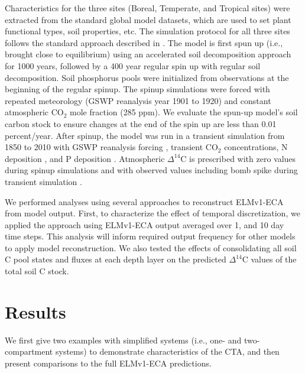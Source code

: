\documentclass[11pt,a4paper]{article}
\newcommand{\red}[1]{\textcolor{red}{#1}}
\newcommand{\gray}[1]{\textcolor{gray}{#1}}
\begin{document}
    Characteristics for the three sites (Boreal, Temperate, and Tropical sites) were extracted from the standard global model datasets, which are used to set plant functional types, soil properties, etc. The simulation protocol for all three sites follows the standard approach described in \citet{Oleson2010}. The model is first spun up (i.e., brought close to equilibrium) using an accelerated soil decomposition approach \citep{Koven2013} for 1000 years, followed by a 400 year regular spin up with regular soil decomposition. Soil phosphorus pools were initialized from observations \citep{Yang2013} at the beginning of the regular spinup. The spinup simulations were forced with repeated meteorology (GSWP reanalysis \citep{Dirmeyer2006} year 1901 to 1920) and constant atmospheric CO$_2$ mole fraction (285 ppm). We evaluate the spun-up model's soil carbon stock to ensure changes at the end of the spin up are less than 0.01 percent/year. After spinup, the model was run in a transient simulation from 1850 to 2010 with GSWP reanalysis forcing \citep{Dirmeyer2006}, transient CO$_2$ concentrations, N deposition \citep{Lamarque2005}, and P deposition \citep{Mahowald2008}. Atmospheric   $\Delta^{14}$C  is prescribed with zero values during spinup simulations and with observed values including bomb spike during transient simulation \citep{Levin2010}.
    
    
    
    We performed analyses using several approaches to reconstruct ELMv1-ECA from model output. First, to characterize the effect of temporal discretization, we applied the approach using ELMv1-ECA output averaged over 1, and 10 day time steps. 
    This analysis will inform required output frequency for other models to apply model reconstruction. We also tested the effects of consolidating all soil C pool states and fluxes at each depth layer on the predicted $\Delta^{14}$C values of the total soil C stock. 

\section{Results}
We first give two examples with simplified systems (i.e., one- and two-compartment systems) to demonstrate characteristics of the CTA, and then present comparisons to the full ELMv1-ECA predictions.
\end{document}
